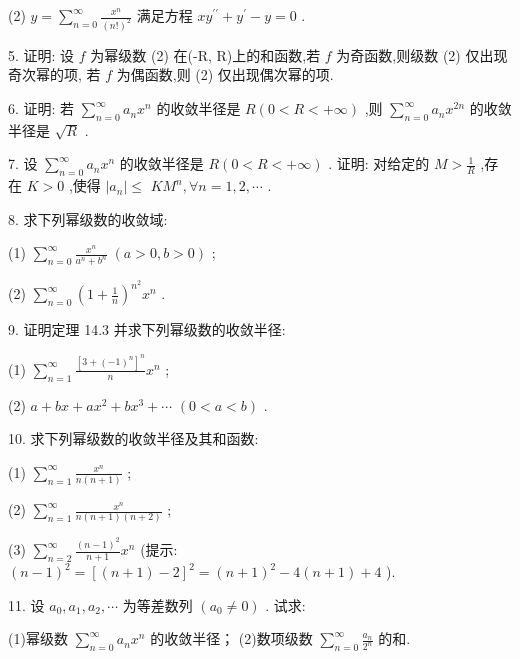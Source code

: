 (2) \(y = \mathop{\sum }\limits_{{n = 0}}^{\infty }\frac{{x}^{n}}{{\left( n!\right) }^{2}}\) 满足方程 \(x{y}^{\prime \prime } + {y}^{\prime } - y = 0\) .

5. 证明: 设 \(f\) 为幂级数 (2) 在(-R, R)上的和函数,若 \(f\) 为奇函数,则级数 (2) 仅出现奇次幂的项, 若 \(f\) 为偶函数,则 (2) 仅出现偶次幂的项.

6. 证明: 若 \(\mathop{\sum }\limits_{{n = 0}}^{\infty }{a}_{n}{x}^{n}\) 的收敛半径是 \(R\left( {0 < R <  + \infty }\right)\) ,则 \(\mathop{\sum }\limits_{{n = 0}}^{\infty }{a}_{n}{x}^{2n}\) 的收敛半径是 \(\sqrt{R}\) .

7. 设 \(\mathop{\sum }\limits_{{n = 0}}^{\infty }{a}_{n}{x}^{n}\) 的收敛半径是 \(R\left( {0 < R <  + \infty }\right)\) . 证明: 对给定的 \(M > \frac{1}{R}\) ,存在 \(K > 0\) ,使得 \(\left| {a}_{n}\right|  \leq\)  \(K{M}^{n},\forall n = 1,2,\cdots\) .

8. 求下列幂级数的收敛域:

(1) \(\mathop{\sum }\limits_{{n = 0}}^{\infty }\frac{{x}^{n}}{{a}^{n} + {b}^{n}}\;\left( {a > 0,b > 0}\right)\) ;

(2) \(\mathop{\sum }\limits_{{n = 0}}^{\infty }{\left( 1 + \frac{1}{n}\right) }^{{n}^{2}}{x}^{n}\) .

9. 证明定理 14.3 并求下列幂级数的收敛半径:

(1) \(\mathop{\sum }\limits_{{n = 1}}^{\infty }\frac{{\left\lbrack  3 + {\left( -1\right) }^{n}\right\rbrack  }^{n}}{n}{x}^{n}\) ;

(2) \(a + {bx} + a{x}^{2} + b{x}^{3} + \cdots\)  \(\left( {0 < a < b}\right)\) .

10. 求下列幂级数的收敛半径及其和函数:

(1) \(\mathop{\sum }\limits_{{n = 1}}^{\infty }\frac{{x}^{n}}{n\left( {n + 1}\right) }\) ;

(2) \(\mathop{\sum }\limits_{{n = 1}}^{\infty }\frac{{x}^{n}}{n\left( {n + 1}\right) \left( {n + 2}\right) }\) ;

(3) \(\mathop{\sum }\limits_{{n = 2}}^{\infty }\frac{{\left( n - 1\right) }^{2}}{n + 1}{x}^{n}\) (提示: \({\left( n - 1\right) }^{2} = {\left\lbrack  \left( n + 1\right)  - 2\right\rbrack  }^{2} = {\left( n + 1\right) }^{2} - 4\left( {n + 1}\right)  + 4\) ).

11. 设 \({a}_{0},{a}_{1},{a}_{2},\cdots\) 为等差数列 \(\left( {{a}_{0} \neq  0}\right)\) . 试求:

(1)幂级数 \(\mathop{\sum }\limits_{{n = 0}}^{\infty }{a}_{n}{x}^{n}\) 的收敛半径； (2)数项级数 \(\mathop{\sum }\limits_{{n = 0}}^{\infty }\frac{{a}_{n}}{{2}^{n}}\) 的和.


